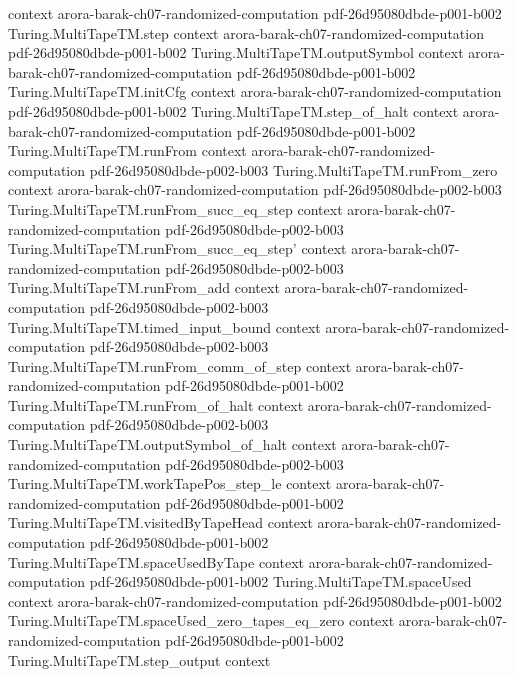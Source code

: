\begin{theorem}
  {context}
  {arora-barak-ch07-randomized-computation}
  {pdf-26d95080dbde-p001-b002}
\proofstep
  {Turing.MultiTapeTM.step}
  {context}
  {arora-barak-ch07-randomized-computation}
  {pdf-26d95080dbde-p001-b002}
\proofstep
  {Turing.MultiTapeTM.outputSymbol}
  {context}
  {arora-barak-ch07-randomized-computation}
  {pdf-26d95080dbde-p001-b002}
\proofstep
  {Turing.MultiTapeTM.initCfg}
  {context}
  {arora-barak-ch07-randomized-computation}
  {pdf-26d95080dbde-p001-b002}
\proofstep
  {Turing.MultiTapeTM.step_of_halt}
  {context}
  {arora-barak-ch07-randomized-computation}
  {pdf-26d95080dbde-p001-b002}
\proofstep
  {Turing.MultiTapeTM.runFrom}
  {context}
  {arora-barak-ch07-randomized-computation}
  {pdf-26d95080dbde-p002-b003}
\proofstep
  {Turing.MultiTapeTM.runFrom_zero}
  {context}
  {arora-barak-ch07-randomized-computation}
  {pdf-26d95080dbde-p002-b003}
\proofstep
  {Turing.MultiTapeTM.runFrom_succ_eq_step}
  {context}
  {arora-barak-ch07-randomized-computation}
  {pdf-26d95080dbde-p002-b003}
\proofstep
  {Turing.MultiTapeTM.runFrom_succ_eq_step'}
  {context}
  {arora-barak-ch07-randomized-computation}
  {pdf-26d95080dbde-p002-b003}
\proofstep
  {Turing.MultiTapeTM.runFrom_add}
  {context}
  {arora-barak-ch07-randomized-computation}
  {pdf-26d95080dbde-p002-b003}
\proofstep
  {Turing.MultiTapeTM.timed_input_bound}
  {context}
  {arora-barak-ch07-randomized-computation}
  {pdf-26d95080dbde-p002-b003}
\proofstep
  {Turing.MultiTapeTM.runFrom_comm_of_step}
  {context}
  {arora-barak-ch07-randomized-computation}
  {pdf-26d95080dbde-p001-b002}
\proofstep
  {Turing.MultiTapeTM.runFrom_of_halt}
  {context}
  {arora-barak-ch07-randomized-computation}
  {pdf-26d95080dbde-p002-b003}
\proofstep
  {Turing.MultiTapeTM.outputSymbol_of_halt}
  {context}
  {arora-barak-ch07-randomized-computation}
  {pdf-26d95080dbde-p002-b003}
\proofstep
  {Turing.MultiTapeTM.workTapePos_step_le}
  {context}
  {arora-barak-ch07-randomized-computation}
  {pdf-26d95080dbde-p001-b002}
\proofstep
  {Turing.MultiTapeTM.visitedByTapeHead}
  {context}
  {arora-barak-ch07-randomized-computation}
  {pdf-26d95080dbde-p001-b002}
\proofstep
  {Turing.MultiTapeTM.spaceUsedByTape}
  {context}
  {arora-barak-ch07-randomized-computation}
  {pdf-26d95080dbde-p001-b002}
\proofstep
  {Turing.MultiTapeTM.spaceUsed}
  {context}
  {arora-barak-ch07-randomized-computation}
  {pdf-26d95080dbde-p001-b002}
\proofstep
  {Turing.MultiTapeTM.spaceUsed_zero_tapes_eq_zero}
  {context}
  {arora-barak-ch07-randomized-computation}
  {pdf-26d95080dbde-p001-b002}
\proofstep
  {Turing.MultiTapeTM.step_output}
  {context}

\end{theorem}
